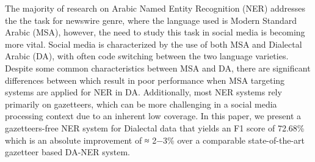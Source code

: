 The majority of research on Arabic Named Entity Recognition (NER) addresses the the task for newswire genre, where the language used is Modern Standard Arabic (MSA), however, the need to study this task in social media is becoming more vital. Social media is characterized by the use of both MSA and Dialectal Arabic (DA), with often code switching between the two language varieties. Despite some common characteristics between MSA and DA, there are significant differences between which result in poor performance when MSA targeting systems are applied for NER in DA. Additionally, most NER systems rely primarily on gazetteers, which can be more challenging in a social media processing context due to an inherent low coverage. In this paper, we present a gazetteers-free NER system for Dialectal data that yields an F1 score of 72.68\% which is an absolute improvement of ≈ 2−3\% over a comparable state-of-the-art gazetteer based DA-NER system.
